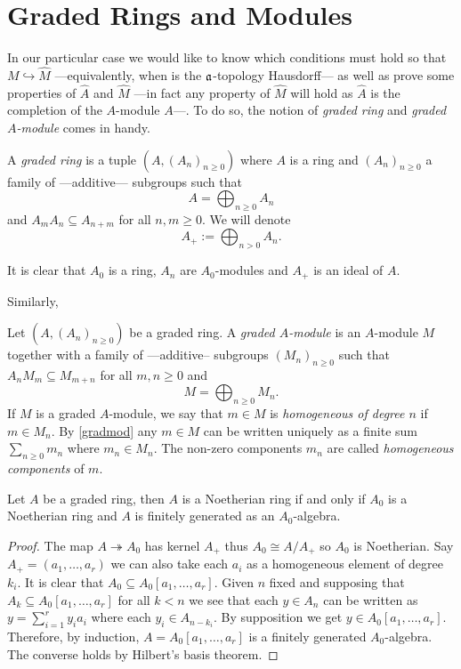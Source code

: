 \section{Graded Rings and Modules}

In our particular case we would like to know which conditions must hold so that $M\hookrightarrow\hat M$ ---equivalently, when is the $\mathfrak{a}$-topology Hausdorff--- as well as prove some properties of $\hat A$ and $\hat M$ ---in fact any property of $\hat M$ will hold as $\hat A$ is the completion of the $A$-module $A$---. To do so, the notion of \emph{graded ring} and \emph{graded $A$-module} comes in handy.

\begin{defi}
    A \emph{graded ring} is a tuple $(A,(A_n)_{n\geq 0})$ where $A$ is a ring and $(A_n)_{n\geq 0}$ a family of ---additive--- subgroups such that 
    \[
    A=\bigoplus_{n\geq 0}A_n
    \]
    and $A_mA_n\subseteq A_{n+m}$ for all $n,m\geq 0$. We will denote
    \[
    A_+:=\bigoplus_{n>0}A_n.
    \]
\end{defi}
It is clear that $A_0$ is a ring, $A_n$ are $A_0$-modules and $A_+$ is an ideal of $A$.

Similarly,
\begin{defi}
    Let $(A,(A_n)_{n\geq 0})$ be a graded ring. A \emph{graded $A$-module} is an $A$-module $M$ together with a family of ---additive-- subgroups $(M_n)_{n\geq 0}$ such that $A_nM_m\subseteq M_{m+n}$ for all $m,n\geq 0$ and
    \begin{equation}\label{gradmod}
    M=\bigoplus_{n\geq 0}M_n.
    \end{equation}
    If $M$ is a graded $A$-module, we say that $m\in M$ is \emph{homogeneous of degree $n$} if $m\in M_n$. By \eqref{gradmod} any $m\in M$ can be written uniquely as a finite sum $\sum_{n\geq 0}m_n$ where $m_n\in M_n$. The non-zero components $m_n$ are called \emph{homogeneous components} of $m$.
\end{defi}

\begin{prop}
    Let $A$ be a graded ring, then $A$ is a Noetherian ring if and only if $A_0$ is a Noetherian ring and $A$ is finitely generated as an $A_0$-algebra.
\end{prop}
\begin{proof}
    The map $A\twoheadrightarrow A_0$ has kernel $A_+$ thus $A_0\cong A/A_+$ so $A_0$ is Noetherian. Say $A_+=(a_1,\ldots,a_r)$ we can also take each $a_i$ as a homogeneous element of degree $k_i$. It is clear that $A_0\subseteq A_0[a_1,\ldots,a_r]$. Given $n$ fixed and supposing that $A_k\subseteq A_0[a_1,\ldots,a_r]$ for all $k< n$ we see that each $y\in A_n$ can be written as $y=\sum_{i=1}^r y_ia_i$ where each $y_i\in A_{n-k_i}$. By supposition we get $y\in A_0[a_1,\ldots,a_r]$. Therefore, by induction, $A=A_0[a_1,\ldots,a_r]$ is a finitely generated $A_0$-algebra. The converse holds by Hilbert's basis theorem.
\end{proof}

